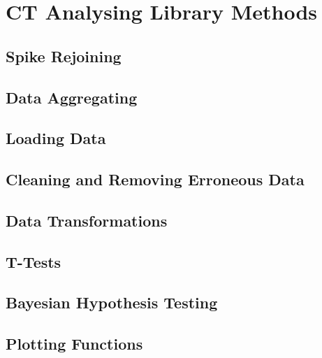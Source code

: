 \documentclass[11pt]{report}
\begin{document}
\section{CT Analysing Library Methods}
\label{sec:orgb0286b2}
\subsection{Spike Rejoining}
\label{sec:org6173f03}
\subsection{Data Aggregating}
\label{sec:org0433c83}
\subsection{Loading Data}
\label{sec:org05de78b}
\subsection{Cleaning and Removing Erroneous Data}
\label{sec:org87529de}
\subsection{Data Transformations}
\label{sec:org007a6b4}
\subsection{T-Tests}
\label{sec:org31c8c9c}
\subsection{Bayesian Hypothesis Testing}
\label{sec:orgf4fe5b0}
\subsection{Plotting Functions}
\label{sec:orgb6e37ef}
\end{document}
